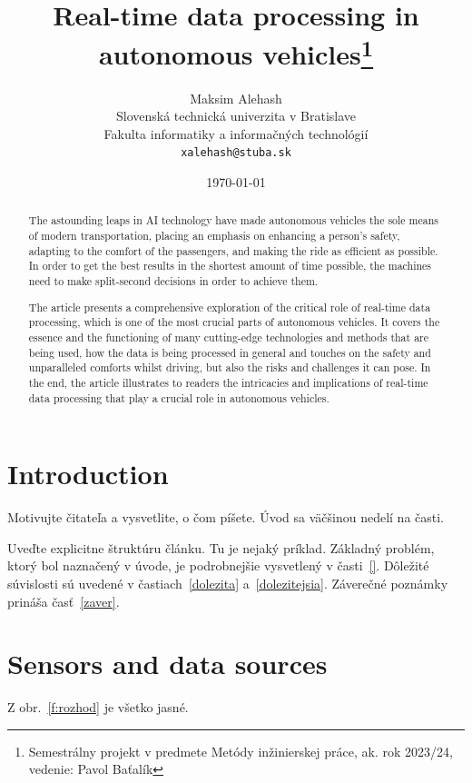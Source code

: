 \documentclass[10pt,oneside,english,a4paper]{article}
\title{Real-time data processing in autonomous vehicles\thanks{Semestrálny projekt v predmete Metódy inžinierskej práce, ak. rok 2023/24, vedenie: Pavol Baťalík}} %
\author{Maksim Alehash\\[2pt]
	{\small Slovenská technická univerzita v Bratislave}\\
	{\small Fakulta informatiky a informačných technológií}\\
	{\small \texttt{xalehash@stuba.sk}}
	}
\date{\small\today} %
\begin{document}
\maketitle

\begin{abstract}
The astounding leaps in AI technology have made autonomous vehicles the sole means of modern transportation, placing an emphasis on enhancing a person's safety, adapting to the comfort of the passengers, and making the ride as efficient as possible. In order to get the best results in the shortest amount of time possible, the machines need to make split-second decisions in order to achieve them. 
\par The article presents a comprehensive exploration of the critical role of real-time data processing, which is one of the most crucial parts of autonomous vehicles. It covers the essence and the functioning of many cutting-edge technologies and methods that are being used, how the data is being processed in general and touches on the safety and unparalleled comforts whilst driving, but also the risks and challenges it can pose. In the end, the article illustrates to readers the intricacies and implications of real-time data processing that play a crucial role in autonomous vehicles.
\end{abstract}


\tableofcontents\pagebreak 


\section{Introduction} \label{introduction}

Motivujte čitateľa a vysvetlite, o čom píšete. Úvod sa väčšinou nedelí na časti.

Uveďte explicitne štruktúru článku. Tu je nejaký príklad.
Základný problém, ktorý bol naznačený v úvode, je podrobnejšie vysvetlený v časti~\ref{}.
Dôležité súvislosti sú uvedené v častiach~\ref{dolezita} a~\ref{dolezitejsia}.
Záverečné poznámky prináša časť~\ref{zaver}.



\section{Sensors and data sources} \label{sensors and data sources}

Z obr.~\ref{f:rozhod} je všetko jasné. 
\end{document}
